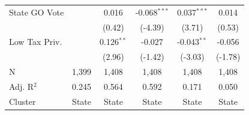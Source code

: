 \begin{tabular*}{\textwidth}{@{\extracolsep{\fill}}lccccc}
   State GO Vote        &               & 0.016          & -0.068$^{***}$ & 0.037$^{***}$  & 0.014\\   
                        &               & (0.42)        & (-4.39)       & (3.71)        & (0.53)\\   
   Low Tax Priv.        &               & 0.126$^{**}$   & -0.027         & -0.043$^{**}$  & -0.056\\   
                        &               & (2.96)        & (-1.42)       & (-3.03)       & (-1.78)\\   
   \hline
   N         & 1,399         & 1,408          & 1,408          & 1,408          & 1,408\\  
   Adj. R$^2$       & 0.245         & 0.564          & 0.592          & 0.171          & 0.050\\  
   Cluster              & State & State & State & State & State\\  
   \bottomrule
\end{tabular*}
\par\endgroup
